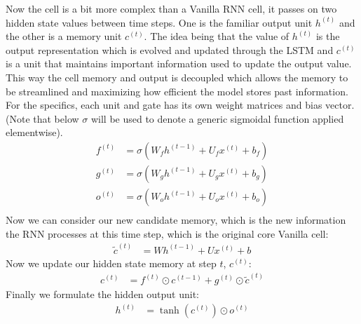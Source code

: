 \documentclass[12pt]{article}
\begin{document}
Now the cell is a bit more complex than a Vanilla RNN cell, it passes on two hidden state values between time steps.
One is the familiar output unit $h^{(t)}$ and the other is a memory unit $c^{(t)}$. The idea being
that the value of $h^{(t)}$ is the output representation which is evolved and updated through the LSTM and
$c^{(t)}$ is a unit that maintains important information used to update the output value. This way the cell
memory and output is decoupled which allows the memory to be streamlined and maximizing how efficient the model
stores past information. For the specifics, each unit and gate has its own weight matrices and bias vector. (Note
that below $\sigma$ will be used to denote a generic sigmoidal function applied elementwise).
\begin{align*}
    f^{(t)} &= \sigma(W_fh^{(t-1)} + U_fx^{(t)} + b_f) \\
    g^{(t)} &= \sigma(W_gh^{(t-1)} + U_gx^{(t)} + b_g) \\
    o^{(t)} &=\sigma(W_oh^{(t-1)} + U_ox^{(t)} + b_o) \\
\end{align*}
Now we can consider our new candidate memory, which is the new information the RNN processes at this time
step, which is the original core Vanilla cell:
\begin{align*}
    \tilde{c}^{(t)} &=  Wh^{(t-1)} + Ux^{(t)} + b
\end{align*}
Now we update our hidden state memory at step $t$, $c^{(t)}$:
\begin{align*}
    c^{(t)} &= f^{(t)} \odot c^{(t-1)} + g^{(t)} \odot \tilde{c}^{(t)}
\end{align*}
Finally we formulate the hidden output unit:
\begin{align*}
    h^{(t)} &= \tanh(c^{(t)}) \odot o^{(t)}
\end{align*}
\end{document}
